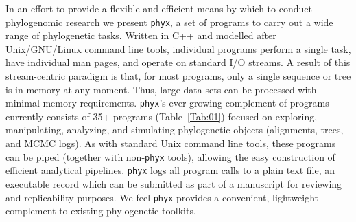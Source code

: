 \documentclass{bioinfo}
\begin{document}
In an effort to provide a flexible and efficient means by which to conduct
phylogenomic research we present \texttt{phyx}, a set of programs to carry
out a wide range of phylogenetic tasks. Written in C++ and modelled after
Unix/GNU/Linux command line tools, individual programs perform a single task,
have individual man pages, and operate on standard I/O streams. A result of
this stream-centric paradigm is that, for most programs, only a single sequence
or tree is in memory at any moment. Thus, large data sets can be
processed with minimal memory requirements. \texttt{phyx}'s
ever-growing complement of programs currently consists of 35+ programs
(Table~\ref{Tab:01}) focused on exploring, manipulating, analyzing,
and simulating phylogenetic objects (alignments, trees, and MCMC logs).
As with standard Unix command line tools, these programs can be piped
(together with non-\texttt{phyx} tools), allowing the easy construction
of efficient analytical pipelines. \texttt{phyx} logs all program calls
to a plain text file, an executable record which can be submitted as
part of a manuscript for reviewing and replicability purposes. We feel
\texttt{phyx} provides a convenient, lightweight complement to existing
phylogenetic toolkits.
\end{document}
